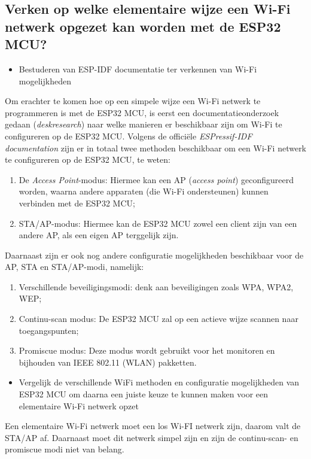 \subsection{Verken op welke elementaire wijze een Wi-Fi netwerk opgezet kan worden met de ESP32 MCU?}
\begin{itemize}
    \item[\ding{226}] Bestuderen van ESP-IDF documentatie ter verkennen van Wi-Fi mogelijkheden
\end{itemize}
Om erachter te komen hoe op een simpele wijze een Wi-Fi netwerk te programmeren is met de ESP32 MCU, is eerst 
een documentatieonderzoek gedaan (\textit{deskresearch}) naar welke manieren er beschikbaar zijn om Wi-Fi te configureren op de ESP32 MCU. 
Volgens de officiële \textit{ESPressif-IDF documentation} \cite{unknowns} zijn er in totaal twee methoden beschikbaar om een Wi-Fi netwerk te configureren op de ESP32 MCU, te weten:  
\begin{enumerate}
    \item De \textit{Access Point}-modus: Hiermee kan een AP (\textit{access point}) geconfigureerd worden, waarna andere apparaten (die Wi-Fi ondersteunen) kunnen verbinden met de ESP32 MCU;
    \item STA/AP-modus: Hiermee kan de ESP32 MCU zowel een client zijn van een andere AP, als een eigen AP terggelijk zijn.
\end{enumerate}
Daarnaast zijn er ook nog andere configuratie mogelijkheden beschikbaar voor de AP, STA en STA/AP-modi, namelijk:
\begin{enumerate}
    \item Verschillende beveiligingsmodi: denk aan beveiligingen zoals WPA, WPA2, WEP;
    \item Continu-scan modus: De ESP32 MCU zal op een actieve wijze scannen naar toegangspunten;
    \item Promiscue modus: Deze modus wordt gebruikt voor het monitoren en bijhouden van IEEE 802.11 (WLAN) pakketten.
  \end{enumerate}
\begin{itemize}
    \item[\ding{226}] Vergelijk de verschillende WiFi methoden en configuratie mogelijkheden van ESP32 MCU om daarna een juiste keuze te kunnen maken voor een elementaire Wi-Fi netwerk opzet
\end{itemize}
Een elementaire Wi-Fi netwerk moet een los Wi-FI netwerk zijn, daarom valt de STA/AP af. 
Daarnaast moet dit netwerk simpel zijn en zijn de continu-scan- en promiscue modi niet van belang. 
